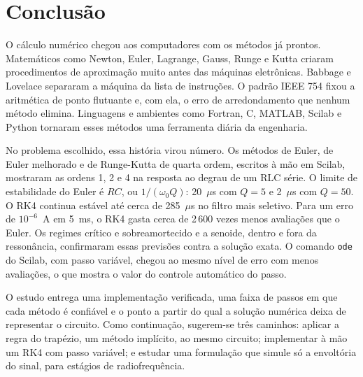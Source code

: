 \section{Conclusão}
\label{sec:conclusao}

O cálculo numérico chegou aos computadores com os métodos já prontos. Matemáticos como Newton, Euler, Lagrange, Gauss, Runge e Kutta criaram procedimentos de aproximação muito antes das máquinas eletrônicas. Babbage e Lovelace separaram a máquina da lista de instruções. O padrão IEEE 754 fixou a aritmética de ponto flutuante e, com ela, o erro de arredondamento que nenhum método elimina. Linguagens e ambientes como Fortran, C, MATLAB, Scilab e Python tornaram esses métodos uma ferramenta diária da engenharia.

No problema escolhido, essa história virou número. Os métodos de Euler, de Euler melhorado e de Runge-Kutta de quarta ordem, escritos à mão em Scilab, mostraram as ordens 1, 2 e 4 na resposta ao degrau de um RLC série. O limite de estabilidade do Euler é \(RC\), ou \(1/(\omega_0 Q)\): 20~\(\mu\)s com \(Q=5\) e 2~\(\mu\)s com \(Q=50\). O RK4 continua estável até cerca de 285~\(\mu\)s no filtro mais seletivo. Para um erro de \(10^{-6}\)~A em 5~ms, o RK4 gasta cerca de 2\,600 vezes menos avaliações que o Euler. Os regimes crítico e sobreamortecido e a senoide, dentro e fora da ressonância, confirmaram essas previsões contra a solução exata. O comando \texttt{ode} do Scilab, com passo variável, chegou ao mesmo nível de erro com menos avaliações, o que mostra o valor do controle automático do passo.

O estudo entrega uma implementação verificada, uma faixa de passos em que cada método é confiável e o ponto a partir do qual a solução numérica deixa de representar o circuito. Como continuação, sugerem-se três caminhos: aplicar a regra do trapézio, um método implícito, ao mesmo circuito; implementar à mão um RK4 com passo variável; e estudar uma formulação que simule só a envoltória do sinal, para estágios de radiofrequência.
